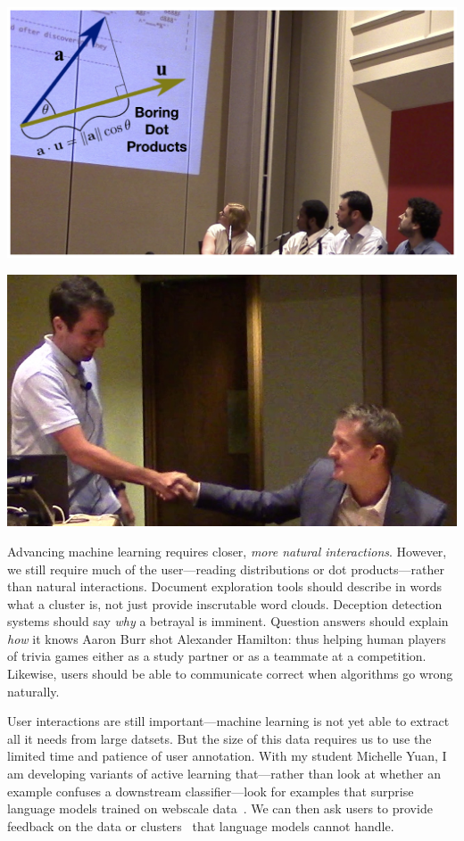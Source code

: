   \begin{minipage}[b]{0.4\textwidth}
    \includegraphics[width=\textwidth]{images/boring_dot_products}
  \end{minipage}
  \hfill
\begin{minipage}[b]{0.4\textwidth}
    \includegraphics[width=\textwidth]{images/jennings_handshake}
  \end{minipage}

Advancing machine learning requires closer, \emph{more natural interactions}.
However, we still require much of the user---reading distributions or dot
products---rather than natural interactions. Document exploration tools should
describe in words what a cluster is, not just provide inscrutable word clouds.
Deception detection systems should say \emph{why} a betrayal is imminent.
Question answers should explain \emph{how} it knows Aaron Burr shot Alexander
Hamilton: thus helping human players of trivia games either as a study partner
or as a teammate at a competition. Likewise, users should be able to
communicate correct when algorithms go wrong naturally.

User interactions are still important---machine learning is not yet able to
extract all it needs from large datsets. But the size of this data requires us
to use the limited time and patience of user annotation. With my
student Michelle Yuan, I am developing
variants of active learning that---rather than look at whether an example
confuses a downstream classifier---look for examples that surprise language
models trained on webscale data~\cite{devlin-19}. We can then ask users to
provide feedback on the data or clusters~\cite{poursabzi-16} that language
models cannot handle.

